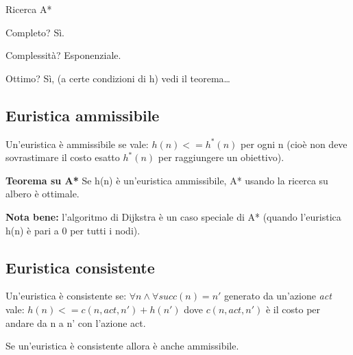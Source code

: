 \begin{algorithm}[H]
    \caption{Ricerca A*}
    \label{alg:algA}
    \begin{algorithmic}[1]
            \State{
            \[
             g(n) = 
              \begin{cases} 
               \infty & \text{if } n \neq S \\
               0    & \text{if } n = S
              \end{cases}
            \]}
              \EndIf
            \EndFor
            \EndWhile
    \end{algorithmic}
\end{algorithm}

Completo? Sì.

Complessità? Esponenziale.

Ottimo? Sì, (a certe condizioni di h) vedi il teorema\dots

\subsection{Euristica ammissibile}

Un'euristica è ammissibile se vale: $h(n) <= h^*(n)$ per ogni n
(cioè non deve sovrastimare il costo esatto $h^*(n)$ per
raggiungere un obiettivo).

\textbf{Teorema su A*}
Se h(n) è un'euristica ammissibile,  A* usando la ricerca su albero è ottimale.

\textbf{Nota bene:} l'algoritmo di Dijkstra è un caso speciale di A* (quando
l'euristica h(n) è pari a 0 per tutti i nodi).

\subsection{Euristica consistente}

Un'euristica è consistente se:
$\forall n \land \forall succ(n) = n'$ generato da un'azione 
\textit{act} vale: $h(n) <= c(n,act,n') + h(n')$
dove $c(n,act,n')$ è il costo per andare da n a n' con l'azione act.

Se un'euristica è consistente allora è anche ammissibile.

